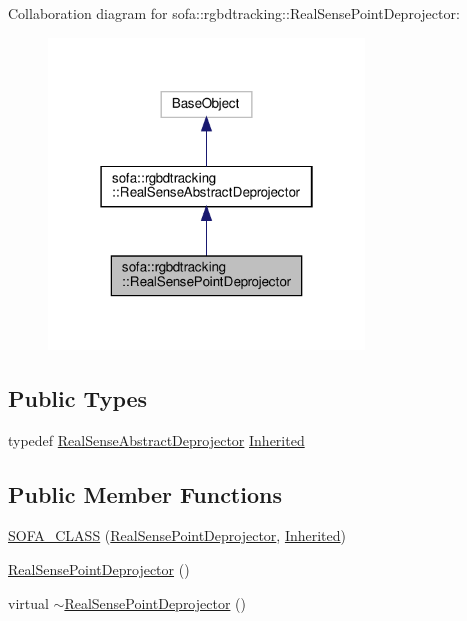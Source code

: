 Collaboration diagram for sofa\+:\+:rgbdtracking\+:\+:Real\+Sense\+Point\+Deprojector\+:\nopagebreak
\begin{figure}[H]
\begin{center}
\leavevmode
\includegraphics[width=238pt]{classsofa_1_1rgbdtracking_1_1_real_sense_point_deprojector__coll__graph}
\end{center}
\end{figure}
\subsection*{Public Types}
\begin{DoxyCompactItemize}
\item 
typedef \hyperlink{classsofa_1_1rgbdtracking_1_1_real_sense_abstract_deprojector}{Real\+Sense\+Abstract\+Deprojector} \hyperlink{classsofa_1_1rgbdtracking_1_1_real_sense_point_deprojector_a06e1fe2c0a7478ad85adf5d3add317f2}{Inherited}
\end{DoxyCompactItemize}
\subsection*{Public Member Functions}
\begin{DoxyCompactItemize}
\item 
\hyperlink{classsofa_1_1rgbdtracking_1_1_real_sense_point_deprojector_ac58e605830c9aec518aab80a94dbea3d}{S\+O\+F\+A\+\_\+\+C\+L\+A\+SS} (\hyperlink{classsofa_1_1rgbdtracking_1_1_real_sense_point_deprojector}{Real\+Sense\+Point\+Deprojector}, \hyperlink{classsofa_1_1rgbdtracking_1_1_real_sense_abstract_deprojector_a9b4cae154f99cca58b05da9c4b0084ab}{Inherited})
\item 
\hyperlink{classsofa_1_1rgbdtracking_1_1_real_sense_point_deprojector_aa91a323cc263151c394eb0bca5a79984}{Real\+Sense\+Point\+Deprojector} ()
\item 
virtual \hyperlink{classsofa_1_1rgbdtracking_1_1_real_sense_point_deprojector_a7a3716ee4596581a49e70923d192afaa}{$\sim$\+Real\+Sense\+Point\+Deprojector} ()
\end{DoxyCompactItemize}
